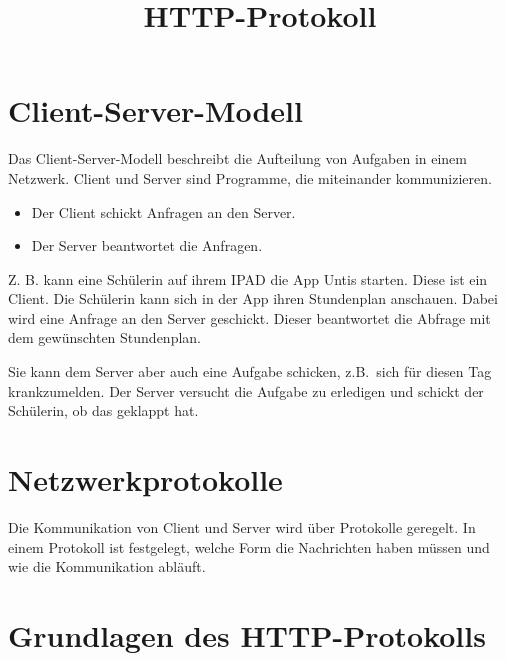 \documentclass[a4paper]{scrartcl}
\date{}
\title{HTTP-Protokoll}
\begin{document}
\maketitle
\section{Client-Server-Modell}\label{sec:client-server-modell}


Das Client-Server-Modell beschreibt die Aufteilung von Aufgaben in einem Netzwerk.
Client und Server sind Programme, die miteinander kommunizieren.


\begin{itemize}
\item Der Client schickt Anfragen an den Server. 
\item Der Server beantwortet die Anfragen.
\end{itemize}

Z. B. kann eine Schülerin auf ihrem IPAD die App Untis starten.
Diese ist ein Client.
Die Schülerin kann sich in der App ihren Stundenplan anschauen.
Dabei wird eine Anfrage an den Server geschickt.
Dieser beantwortet die Abfrage mit dem gewünschten Stundenplan.

Sie kann dem Server aber auch eine Aufgabe schicken, z.B.\ sich für diesen Tag krankzumelden.
Der Server versucht die Aufgabe zu erledigen und schickt der Schülerin, ob das geklappt hat.

\section{Netzwerkprotokolle}\label{sec:netzwerkprotokolle}

Die Kommunikation von Client und Server wird über Protokolle geregelt.
In einem Protokoll ist festgelegt, welche Form die Nachrichten haben müssen und wie die Kommunikation abläuft.

\section{Grundlagen des HTTP-Protokolls}\label{sec:grundlagen-des-http-protokolls}
\end{document}
